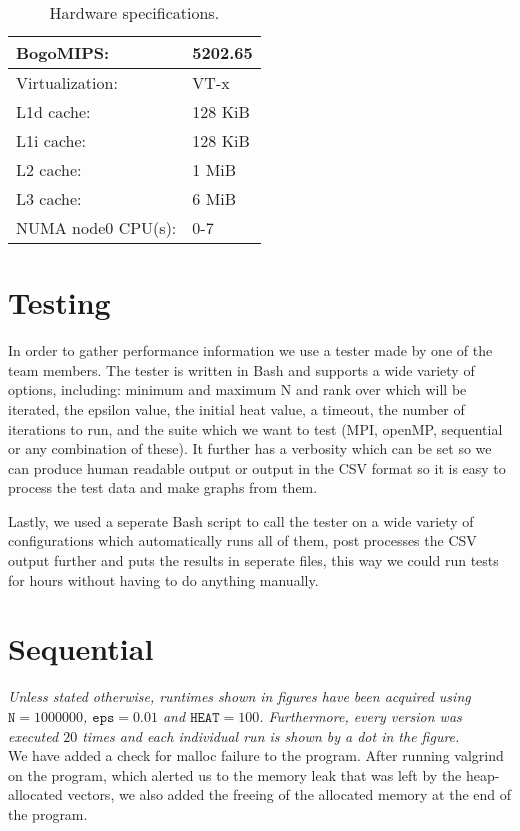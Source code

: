 \documentclass[a4paper]{article}
\begin{document}
\begin{table}[h]
\begin{tabular}{|l|l|}
        BogoMIPS:            &    5202.65\\\hline
        Virtualization:      &    VT-x\\\hline
        L1d cache:           &    128 KiB\\\hline
        L1i cache:           &    128 KiB\\\hline
        L2 cache:            &    1 MiB\\\hline
        L3 cache:            &    6 MiB\\\hline
        NUMA node0 CPU(s):   &    0-7\\
        \hline
    \end{tabular}
    \caption{Hardware specifications.}
    \label{tab: hardware}
\end{table}

\section{Testing}
In order to gather performance information we use a tester made by one of the team members. The tester is written in Bash and supports a wide variety of options, including: minimum and maximum N and rank over which will be iterated, the epsilon value, the initial heat value, a timeout, the number of iterations to run, and the suite which we want to test (MPI, openMP, sequential or any combination of these). It further has a verbosity which can be set so we can produce human readable output or output in the CSV format so it is easy to process the test data and make graphs from them.

Lastly, we used a seperate Bash script to call the tester on a wide variety of configurations which automatically runs all of them, post processes the CSV output further and puts the results in seperate files, this way we could run tests for hours without having to do anything manually.


\section{Sequential}
\textit{Unless stated otherwise, runtimes shown in figures have been acquired using $\texttt{N} = 1000000$, $\texttt{eps} = 0.01$ and $\texttt{HEAT} = 100$. Furthermore, every version was executed $20$ times and each individual run is shown by a dot in the figure.}\\

\noindent We have added a check for malloc failure to the program. After running valgrind on the program, which alerted us to the memory leak that was left by the heap-allocated vectors, we also added the freeing of the allocated memory at the end of the program.
\end{document}
